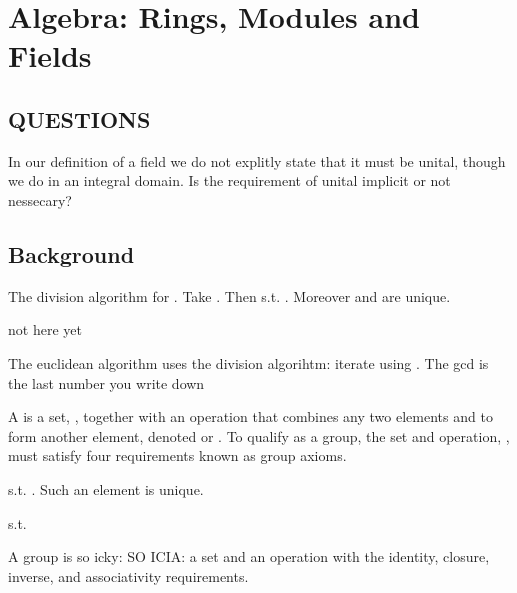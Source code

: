 \section{Algebra: Rings, Modules and Fields}

\subsection{QUESTIONS}
\begin{compactitem}
\item In our definition of a field we do not explitly state that it must be unital, though we do in an integral domain. Is the requirement of unital implicit or not nessecary?
\item 
\end{compactitem}

\subsection{Background}
\begin{T} The division algorithm for . Take . Then  s.t. . Moreover  and  are unique. \end{T}
\begin{PP} not here yet \end{PP}

\begin{T} The euclidean algorithm uses the division algorihtm: iterate using . The gcd is the last number you write down \end{T}

\begin{D}
A  is a set, , together with an operation \e{$\cdot$} that combines any two elements  and  to form another element, denoted  or . To qualify as a group, the set and operation, , must satisfy four requirements known as group axioms. \begin{compactitem}
\item[\dw{Closure}] 
\item[\dw{Associativity}] 
\item[\dw{Identity element}]  s.t. . Such an element is unique.
\item[\dw{Inverse element}]  s.t. 
\end{compactitem}
\end{D}
\begin{R} A group is so icky: SO ICIA: a set and an operation with the identity, closure, inverse, and associativity requirements.\end{R}


